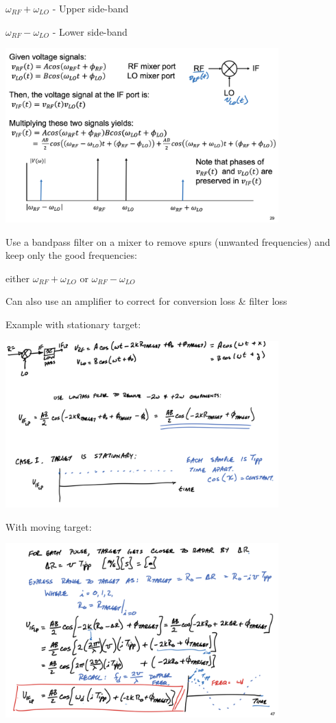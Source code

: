 \documentclass[10pt]{article}
\begin{document}
\begin{enumerate}
$\omega_{RF} +\omega_{LO}$ - Upper side-band

$\omega_{RF} -\omega_{LO}$ - Lower side-band

\includegraphics[width=0.79\textwidth]{figs/mixer_operation.png}


Use a bandpass filter on a mixer to remove spurs (unwanted frequencies) and keep only the good frequencies:

either $\omega_{RF} +\omega_{LO}$ or $\omega_{RF} -\omega_{LO}$

Can also use an amplifier to correct for
conversion loss \& filter loss

Example with stationary target:

\includegraphics[width=0.79\textwidth]{figs/mixer_stationary_target.png}

With moving target:

\includegraphics[width=0.79\textwidth]{figs/mixer_moving_target.png}


\end{enumerate}
\end{document}
